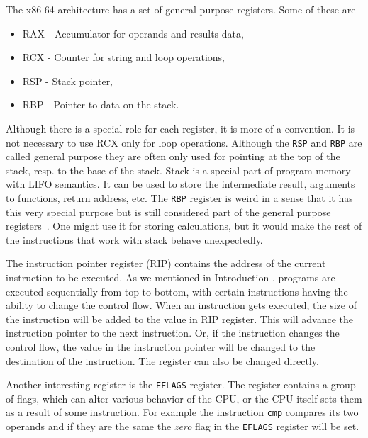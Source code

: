 The x86-64 architecture has a set of general purpose registers.
Some of these are
\begin{itemize}
    \item RAX - Accumulator for operands and results data,
    \item RCX - Counter for string and loop operations,
    \item RSP - Stack pointer,
    \item RBP - Pointer to data on the stack.
\end{itemize}
Although there is a special role for each register, it is more of a convention.
It is not necessary to use RCX only for loop operations. Although the
\texttt{RSP} and \texttt{RBP} are called general purpose they are often only
used for pointing at the top of the stack, resp. to the base of the stack.
Stack is a special part of program memory with LIFO semantics. It can be used
to store the intermediate result, arguments to functions, return address, etc.
The \texttt{RBP} register is weird in a sense that it has this very special
purpose but is still considered part of the general purpose
registers~\cite{intel-manual}. One might use it for storing calculations, but
it would make the rest of the instructions that work with stack behave
unexpectedly.

The instruction pointer register (RIP) contains the address of the current
instruction to be executed. As we mentioned in Introduction ,
programs are executed sequentially from top to bottom, with certain
instructions having the ability to change the control flow. When an instruction
gets executed, the size of the instruction will be added to the value in RIP
register. This will advance the instruction pointer to the next instruction.
Or, if the instruction changes the control flow, the value in the instruction
pointer will be changed to the destination of the instruction. The register can
also be changed directly.

Another interesting register is the \texttt{EFLAGS} register. The register
contains a group of flags, which can alter various behavior of the CPU, or the
CPU itself sets them as a result of some instruction. For example the
instruction \texttt{cmp} compares its two operands and if they are the same the
\textit{zero} flag in the \texttt{EFLAGS} register will be set.

